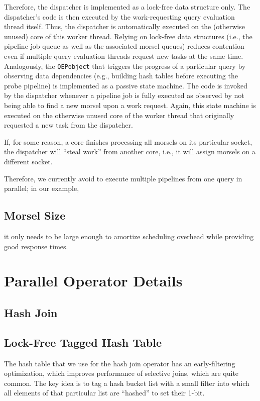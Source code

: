 \documentclass[11pt]{article}
\begin{document}
Therefore, the dispatcher is implemented as a lock-free data structure only. The dispatcher’s code is
then executed by the work-requesting query evaluation thread itself. Thus, the dispatcher is
automatically executed on the (otherwise unused) core of this worker thread. Relying on lock-free data
structures (i.e., the pipeline job queue as well as the associated morsel queues) reduces contention
even if multiple query evaluation threads request new tasks at the same time. Analogously, the
\texttt{QEPobject} that triggers the progress of a particular query by observing data dependencies (e.g.,
building hash tables before executing the probe pipeline) is implemented as a passive state machine.
The code is invoked by the dispatcher whenever a pipeline job is fully executed as observed by not
being able to find a new morsel upon a work request. Again, this state machine is executed on the
otherwise unused core of the worker thread that originally requested a new task from the dispatcher.

If, for some reason, a core finishes processing all morsels on its particular socket, the dispatcher
will “steal work” from another core, i.e., it will assign morsels on a different socket.

Therefore, we currently avoid to execute multiple pipelines from one query in parallel; in our example,
\subsection{Morsel Size}
\label{sec:org0c16f09}
it only needs to be large enough to amortize scheduling overhead while providing good response times.
\section{Parallel Operator Details}
\label{sec:orga54e071}
\subsection{Hash Join}
\label{sec:org40f28b7}
\subsection{Lock-Free Tagged Hash Table}
\label{sec:org136bc8f}
The hash table that we use for the hash join operator has an early-filtering optimization, which
improves performance of selective joins, which are quite common. The key idea is to tag a hash bucket
list with a small filter into which all elements of that particular list are “hashed” to set their
1-bit.
\end{document}
